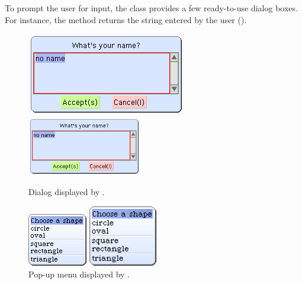 \documentclass[a4paper,10pt,twoside]{book}
\begin{document}
To prompt the user for input, the  class provides a few ready-to-use dialog boxes.
For instance, the  method returns the string entered by the user ().

\begin{figure}[htb]
\begin{minipage}{0.55\textwidth}
	\ifluluelse
		{\centerline{\includegraphics[scale=0.65]{dialog}}}
		{\centerline{\includegraphics[width=5cm]{dialog}}}
	\caption{Dialog displayed by .
		\label{fig:dialogName}}
\end{minipage}
\hfill
\begin{minipage}{0.38\textwidth}
	\vfill
	\ifluluelse
		{\centerline{\includegraphics [scale=0.65]{popup}}}
		{\centerline{\includegraphics[width=3cm]{popup}}}
	\vfill
	\vspace{4ex}
	\caption{Pop-up menu displayed by .}
\end{minipage}
\end{figure}

\end{document}
